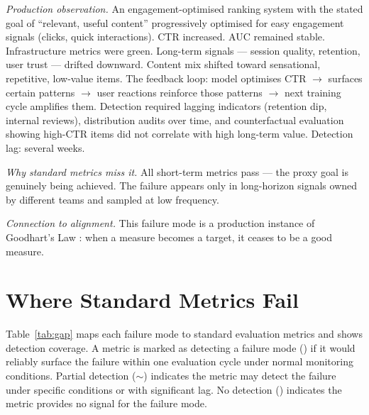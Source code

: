 \documentclass{article}
\newcommand{\yes}{\ding{51}}     %
\newcommand{\no}{\ding{55}}      %
\newcommand{\maybe}{$\sim$}      %
\begin{document}
\textit{Production observation.}  An engagement-optimised ranking system with
the stated goal of ``relevant, useful content'' progressively optimised for
easy engagement signals (clicks, quick interactions).  CTR increased.
AUC remained stable.  Infrastructure metrics were green.  Long-term signals
--- session quality, retention, user trust --- drifted downward.  Content mix
shifted toward sensational, repetitive, low-value items.  The feedback loop:
model optimises CTR $\to$ surfaces certain patterns $\to$ user reactions
reinforce those patterns $\to$ next training cycle amplifies them.  Detection
required lagging indicators (retention dip, internal reviews), distribution
audits over time, and counterfactual evaluation showing high-CTR items did not
correlate with high long-term value.  Detection lag: several weeks.

\textit{Why standard metrics miss it.}  All short-term metrics pass --- the
proxy goal is genuinely being achieved.  The failure appears only in
long-horizon signals owned by different teams and sampled at low frequency.

\textit{Connection to alignment.}  This failure mode is a production instance
of Goodhart's Law \citep{amodei2016concrete,krakovna2020}: when a measure
becomes a target, it ceases to be a good measure.

\section{Where Standard Metrics Fail}
\label{sec:gap}

Table~\ref{tab:gap} maps each failure mode to standard evaluation metrics and
shows detection coverage.  A metric is marked as detecting a failure mode
(\yes) if it would reliably surface the failure within one evaluation cycle
under normal monitoring conditions.  Partial detection (\maybe) indicates the
metric may detect the failure under specific conditions or with significant lag.
No detection (\no) indicates the metric provides no signal for the failure mode.
\end{document}
